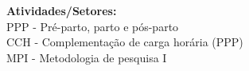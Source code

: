 {\fontsize{10pt}{12pt}\selectfont
\noindent
\textbf{Atividades/Setores:}\\
PPP - Pré-parto, parto e pós-parto\\
CCH - Complementação de carga horária (PPP)\\
MPI - Metodologia de pesquisa I
}